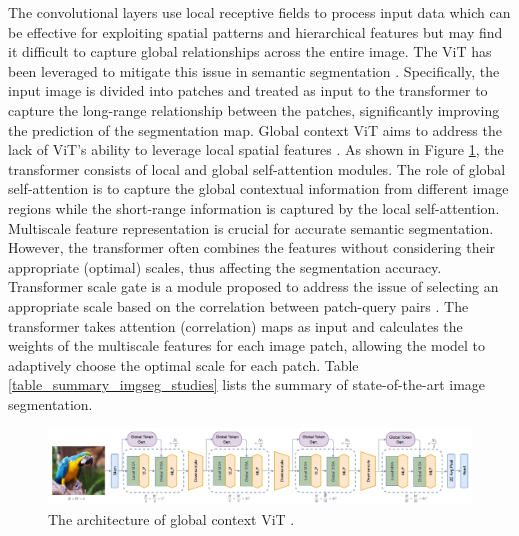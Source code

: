 \documentclass[preprint,12pt]{elsarticle}
\begin{document}
The convolutional layers use local receptive fields to process input data which can be effective for exploiting spatial patterns and hierarchical features but may find it difficult to capture global relationships across the entire image. The ViT has been leveraged to mitigate this issue in semantic segmentation \citep{strudel_segmenter_2021}. Specifically, the input image is divided into patches and treated as input to the transformer to capture the long-range relationship between the patches, significantly improving the prediction of the segmentation map. Global context ViT aims to address the lack of ViT’s ability to leverage local spatial features \citep{hatamizadeh_global_2023}. As shown in Figure \ref{fig_img_seg_GC-ViT}, the transformer consists of local and global self-attention modules. The role of global self-attention is to capture the global contextual information from different image regions while the short-range information is captured by the local self-attention. Multiscale feature representation is crucial for accurate semantic segmentation. However, the transformer often combines the features without considering their appropriate (optimal) scales, thus affecting the segmentation accuracy. Transformer scale gate is a module proposed to address the issue of selecting an appropriate scale based on the correlation between patch-query pairs \citep{shi_transformer_2023}. The transformer takes attention (correlation) maps as input and calculates the weights of the multiscale features for each image patch, allowing the model to adaptively choose the optimal scale for each patch. Table \ref{table_summary_imgseg_studies} lists the summary of state-of-the-art image segmentation.

\begin{figure}[h!]
    \centering
    \includegraphics[scale=0.7]{fig_img_seg_GC-ViT.png}
    \caption{The architecture of global context ViT \citep{hatamizadeh_global_2023}.}
    \label{fig_img_seg_GC-ViT}
\end{figure}
\end{document}
